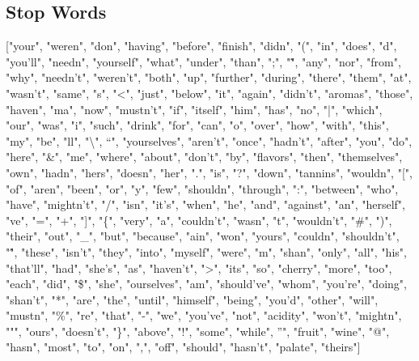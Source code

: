\documentclass[11pt,english]{article}
\begin{document}
\subsection{Stop Words}
["your", "weren", "don", "having", "before", "finish", "didn", "(", "in", "does", "d", "you'll", "needn", "yourself", "what", "under", "than", ";", "\~", "any", "nor", "from", "why", "needn't", "weren't", "both", "up", "further", "during", "there", "them", "at", "wasn't", "same", "s", "<", "just", "below", "it", "again", "didn't", "aromas", "those", "haven", "ma", "now", "mustn't", "if", "itself", "him", "has", "no", "|", "which", "our", "was", "i", "such", "drink", "for", "can", "o", "over", "how", "with", "this", "my", "be", "ll", "\textbackslash", "`", "yourselves", "aren't", "once", "hadn't", "after", "you", "do", "here", "\&", "me", "where", "about", "don't", "by", "flavors", "then", "themselves", "own", "hadn", "hers", "doesn", "her", ".", "is", "?", "down", "tannins", "wouldn", "[", "of", "aren", "been", "or", "y", "few", "shouldn", "through", ":", "between", "who", "have", "mightn't", "/", "isn", "it's", "when", "he", "and", "against", "an", "herself", "ve", "=", "+", "]", "\{", "very", "a", "couldn't", "wasn", "t", "wouldn't", "\#", ")", "their", "out", "\_", "but", "because", "ain", "won", "yours", "couldn", "shouldn't", "\^", "these", "isn't", "they", "into", "myself", "were", "m", "shan", "only", "all", "his", "that'll", "had", "she's", "as", "haven't", ">", "its", "so", "cherry", "more", "too", "each", "did", "\$", "she", "ourselves", "am", "should've", "whom", "you're", "doing", "shan't", "*", "are", "the", "until", "himself", "being", "you'd", "other", "will", "mustn", "\%", "re", "that", "-", "we", "you've", "not", "acidity", "won't", "mightn", """, "ours", "doesn't", "\}", "above", "!", "some", "while", "'", "fruit", "wine", "@", "hasn", "most", "to", "on", ",", "off", "should", "hasn't", "palate", "theirs"]
\end{document}
